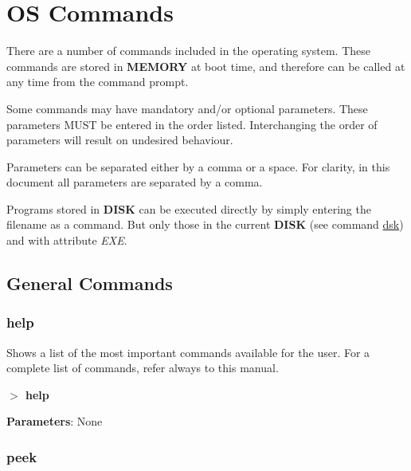 \section{OS Commands}
There are a number of commands included in the operating system. These
commands are stored in \textbf{MEMORY} at boot time, and therefore can be
called at any time from the command prompt.

Some commands may have mandatory and/or optional parameters. These
parameters MUST be entered in the order listed. Interchanging the order of
parameters will result on undesired behaviour.

Parameters can be separated either by a comma or a space. For clarity, in
this document all parameters are separated by a comma.

Programs stored in \textbf{DISK} can be executed directly by simply entering
the filename as a command. But only those in the current \textbf{DISK} (see
command \hyperref[cmd:dsk]{dsk}) and with attribute \textit{EXE}.

    \subsection{General Commands}\label{gencmds}
        
        \subsubsection{{help}}
        Shows a list of the most important commands available for the user.
        For a complete list of commands, refer always to this manual.

        \hspace{1.9cm}\textbf{$>$ help}

        \textbf{Parameters}: None

        \subsubsection{{peek}}
        \label{cmd:peek}

